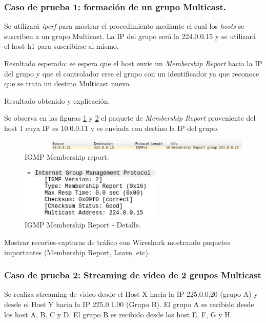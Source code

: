 \documentclass[12pt,a4paper,oneside]{book}
\begin{document}
\subsubsection{Caso de prueba 1: formación de un grupo Multicast.} 
Se utilizará \textit{iperf} para mostrar el procedimiento mediante el cual los \textit{hosts} se suscriben a un grupo Multicast. La IP del grupo será la 224.0.0.15 y se utilizará el host h1 para suscribirse al mismo.

\vspace{0.5cm}
Resultado esperado: se espera que el host envíe un \textit{Membership Report} hacia la IP del grupo y que el controlador cree el grupo con un identificador ya que reconoce que se trata un destino Multicast nuevo.


\vspace{0.5cm}
Resultado obtenido y explicación: 

Se observa en las figuras \ref{igmp_mr_h1} y \ref{igmp_mr_h1_detail} el paquete de \textit{Membership Report} proveniente del host 1 cuya IP es 10.0.0.11 y es enviada con destino la IP del grupo.

\begin{figure}[ht]
 \centering
 \includegraphics[width=1\textwidth]{fotos/5_Pruebas/1_topo_lineales/Casos/1/wire_igmp_de_host1.png}
 \caption{IGMP Membership report.}
 \label{igmp_mr_h1}
\end{figure}

\begin{figure}[ht]
 \centering
 \includegraphics[width=0.6\textwidth]{fotos/5_Pruebas/1_topo_lineales/Casos/1/wire_igmp_detail.png}
 \caption{IGMP Membership Report - Detalle.}
 \label{igmp_mr_h1_detail}
\end{figure}



\vspace{0.5cm}
Mostrar recortes-capturas de tráfico con Wireshark mostrando paquetes importantes (Membership Report, Leave, etc).

\subsubsection{Caso de prueba 2: Streaming de video de 2 grupos Multicast} 
Se realiza streaming de video desde el Host X hacia la IP 225.0.0.20 (grupo A) y desde el Host Y hacia la IP 225.0.1.90 (Grupo B). El grupo A es recibido desde los host A, B, C y D. El grupo B es recibido desde los host E, F, G y H.
\end{document}
